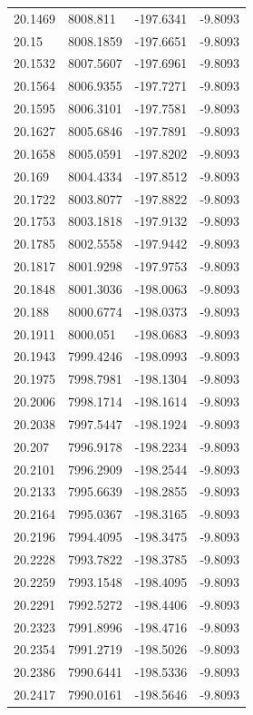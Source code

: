 \begin{table}[H]
\begin{tabular}{llll}
20.1469 & 8008.811 & -197.6341 & -9.8093 \\
20.15 & 8008.1859 & -197.6651 & -9.8093 \\
20.1532 & 8007.5607 & -197.6961 & -9.8093 \\
20.1564 & 8006.9355 & -197.7271 & -9.8093 \\
20.1595 & 8006.3101 & -197.7581 & -9.8093 \\
20.1627 & 8005.6846 & -197.7891 & -9.8093 \\
20.1658 & 8005.0591 & -197.8202 & -9.8093 \\
20.169 & 8004.4334 & -197.8512 & -9.8093 \\
20.1722 & 8003.8077 & -197.8822 & -9.8093 \\
20.1753 & 8003.1818 & -197.9132 & -9.8093 \\
20.1785 & 8002.5558 & -197.9442 & -9.8093 \\
20.1817 & 8001.9298 & -197.9753 & -9.8093 \\
20.1848 & 8001.3036 & -198.0063 & -9.8093 \\
20.188 & 8000.6774 & -198.0373 & -9.8093 \\
20.1911 & 8000.051 & -198.0683 & -9.8093 \\
20.1943 & 7999.4246 & -198.0993 & -9.8093 \\
20.1975 & 7998.7981 & -198.1304 & -9.8093 \\
20.2006 & 7998.1714 & -198.1614 & -9.8093 \\
20.2038 & 7997.5447 & -198.1924 & -9.8093 \\
20.207 & 7996.9178 & -198.2234 & -9.8093 \\
20.2101 & 7996.2909 & -198.2544 & -9.8093 \\
20.2133 & 7995.6639 & -198.2855 & -9.8093 \\
20.2164 & 7995.0367 & -198.3165 & -9.8093 \\
20.2196 & 7994.4095 & -198.3475 & -9.8093 \\
20.2228 & 7993.7822 & -198.3785 & -9.8093 \\
20.2259 & 7993.1548 & -198.4095 & -9.8093 \\
20.2291 & 7992.5272 & -198.4406 & -9.8093 \\
20.2323 & 7991.8996 & -198.4716 & -9.8093 \\
20.2354 & 7991.2719 & -198.5026 & -9.8093 \\
20.2386 & 7990.6441 & -198.5336 & -9.8093 \\
20.2417 & 7990.0161 & -198.5646 & -9.8093 \\

\end{tabular}
\end{table}
